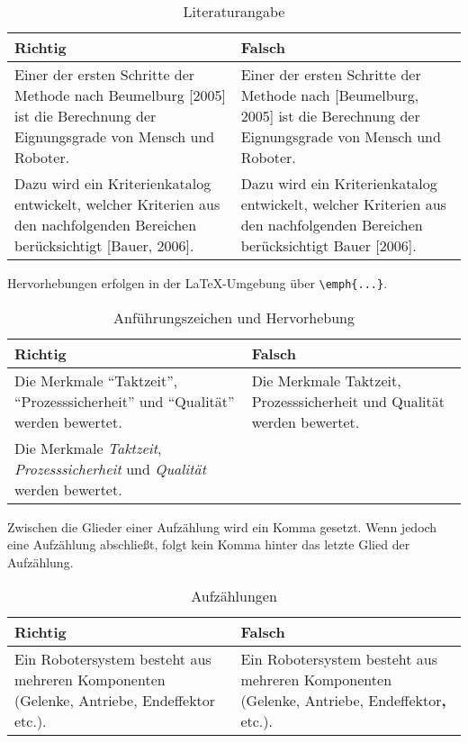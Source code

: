 \renewcommand{\arraystretch}{1.2}
\begin{table}[H]
	  \centering
		\caption{Literaturangabe}
		\begin{tabular}{|p{}|p{}|}
			\hline 
			\textbf{Richtig} & \textbf{Falsch} \tabularnewline
			 \hline		
					Einer der ersten Schritte der Methode nach Beumelburg [2005] ist die Berechnung der Eignungsgrade von Mensch und Roboter. &
					Einer der ersten Schritte der Methode nach [Beumelburg, 2005] ist die Berechnung der Eignungsgrade von Mensch und Roboter. \\
					Dazu wird ein Kriterienkatalog entwickelt, welcher Kriterien aus den nachfolgenden Bereichen berücksichtigt [Bauer, 2006]. &
					Dazu wird ein Kriterienkatalog entwickelt, welcher Kriterien aus den nachfolgenden Bereichen berücksichtigt Bauer [2006]. \\
	 		 \hline
		\end{tabular}	
\end{table}
\renewcommand{\arraystretch}{1}

\noindent
Hervorhebungen erfolgen in der LaTeX-Umgebung über \verb+\emph{...}+.


\renewcommand{\arraystretch}{1.2}
\begin{table}[H]
	  \centering
		\caption{Anführungszeichen und Hervorhebung}
		\begin{tabular}{|p{}|p{}|}
			\hline 
			\textbf{Richtig} & \textbf{Falsch} \tabularnewline
			 \hline		
					Die Merkmale "`Taktzeit"', "`Prozesssicherheit"' und "`Qualität"' werden bewertet. &
					Die Merkmale Taktzeit, Prozesssicherheit und Qualität werden bewertet. \\
					Die Merkmale \emph{Taktzeit}, \emph{Prozesssicherheit} und \emph{Qualität} werden bewertet. &
					\\
	 		 \hline
		\end{tabular}	
\end{table}
\renewcommand{\arraystretch}{1}

\noindent
Zwischen die Glieder einer Aufzählung wird ein Komma gesetzt. Wenn jedoch eine Aufzählung abschließt, folgt kein Komma hinter das letzte Glied der Aufzählung.

\renewcommand{\arraystretch}{1.2}
\begin{table}[H]
	  \centering
		\caption{Aufzählungen}
		\begin{tabular}{|p{}|p{}|}
			\hline 
			\textbf{Richtig} & \textbf{Falsch} \tabularnewline
			 \hline		
					Ein Robotersystem besteht aus mehreren Komponenten (Gelenke, Antriebe, Endeffektor etc.). &
					Ein Robotersystem besteht aus mehreren Komponenten (Gelenke, Antriebe, Endeffektor\textbf{,} etc.). \\
	 		 \hline
		\end{tabular}	
\end{table}
\renewcommand{\arraystretch}{1}




